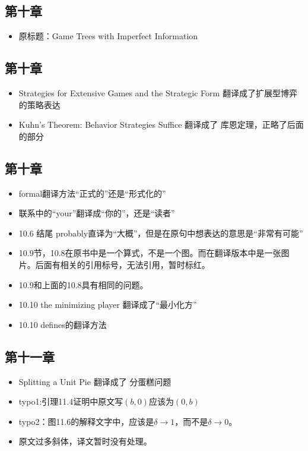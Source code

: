 \subsection{第十章}
\begin{itemize}
    \item 原标题：Game Trees with Imperfect Information
\end{itemize}

\subsection{第十章}
\begin{itemize}
\item Strategies for Extensive Games and the Strategic Form 翻译成了扩展型博弈的策略表达

\item Kuhn’s Theorem: Behavior Strategies Suffice 翻译成了 库恩定理，正略了后面的部分
\end{itemize}

\subsection{第十章}
\begin{itemize}  
\item formal翻译方法“正式的”还是“形式化的”
\item 联系中的“your”翻译成“你的”，还是“读者”
\item 10.6 结尾 probably直译为“大概”，但是在原句中想表达的意思是“非常有可能”
\item 10.9节，10.8在原书中是一个算式，不是一个图。而在翻译版本中是一张图片。后面有相关的引用标号，无法引用，暂时标红。
\item 10.9和上面的10.8具有相同的问题。
\item 10.10 the minimizing player 翻译成了“最小化方”
\item 10.10 defines的翻译方法

\end{itemize}

\subsection{第十一章}
\begin{itemize}  
\item Splitting a Unit Pie 翻译成了 分蛋糕问题
\item typo1:引理11.4证明中原文写$(b,0)$应该为$(0,b)$
\item typo2：图11.6的解释文字中，应该是${\delta\rightarrow1}$，而不是${\delta\rightarrow0}$。
\item 原文过多斜体，译文暂时没有处理。
\end{itemize}